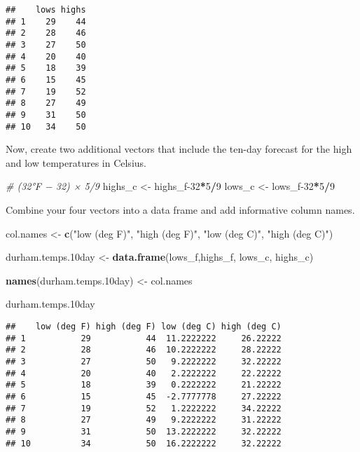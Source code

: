 \documentclass[
]{article}
\newenvironment{Shaded}{\begin{snugshade}}{\end{snugshade}}
\newcommand{\CommentTok}[1]{\textcolor[rgb]{0.56,0.35,0.01}{\textit{#1}}}
\newcommand{\DecValTok}[1]{\textcolor[rgb]{0.00,0.00,0.81}{#1}}
\newcommand{\FloatTok}[1]{\textcolor[rgb]{0.00,0.00,0.81}{#1}}
\newcommand{\KeywordTok}[1]{\textcolor[rgb]{0.13,0.29,0.53}{\textbf{#1}}}
\newcommand{\NormalTok}[1]{#1}
\newcommand{\OperatorTok}[1]{\textcolor[rgb]{0.81,0.36,0.00}{\textbf{#1}}}
\newcommand{\StringTok}[1]{\textcolor[rgb]{0.31,0.60,0.02}{#1}}
\begin{document}
\begin{verbatim}
##    lows highs
## 1    29    44
## 2    28    46
## 3    27    50
## 4    20    40
## 5    18    39
## 6    15    45
## 7    19    52
## 8    27    49
## 9    31    50
## 10   34    50
\end{verbatim}

Now, create two additional vectors that include the ten-day forecast for
the high and low temperatures in Celsius.

\begin{Shaded}
\begin{Highlighting}[]
\CommentTok{# (32°F − 32) × 5/9 }
\NormalTok{highs_c <-}\StringTok{ }\NormalTok{highs_f}\DecValTok{-32}\OperatorTok{*}\DecValTok{5}\OperatorTok{/}\DecValTok{9}
\NormalTok{lows_c <-}\StringTok{ }\NormalTok{lows_f}\DecValTok{-32}\OperatorTok{*}\DecValTok{5}\OperatorTok{/}\DecValTok{9}
\end{Highlighting}
\end{Shaded}

Combine your four vectors into a data frame and add informative column
names.

\begin{Shaded}
\begin{Highlighting}[]
\NormalTok{col.names <-}\StringTok{ }\KeywordTok{c}\NormalTok{(}\StringTok{"low (deg F)"}\NormalTok{, }\StringTok{"high (deg F)"}\NormalTok{, }\StringTok{"low (deg C)"}\NormalTok{, }\StringTok{"high (deg C)"}\NormalTok{)}

\NormalTok{durham.temps}\FloatTok{.10}\NormalTok{day <-}\StringTok{ }\KeywordTok{data.frame}\NormalTok{(lows_f,highs_f, lows_c, highs_c)}

\KeywordTok{names}\NormalTok{(durham.temps}\FloatTok{.10}\NormalTok{day) <-}\StringTok{ }\NormalTok{col.names}

\NormalTok{durham.temps}\FloatTok{.10}\NormalTok{day               }
\end{Highlighting}
\end{Shaded}

\begin{verbatim}
##    low (deg F) high (deg F) low (deg C) high (deg C)
## 1           29           44  11.2222222     26.22222
## 2           28           46  10.2222222     28.22222
## 3           27           50   9.2222222     32.22222
## 4           20           40   2.2222222     22.22222
## 5           18           39   0.2222222     21.22222
## 6           15           45  -2.7777778     27.22222
## 7           19           52   1.2222222     34.22222
## 8           27           49   9.2222222     31.22222
## 9           31           50  13.2222222     32.22222
## 10          34           50  16.2222222     32.22222
\end{verbatim}
\end{document}
